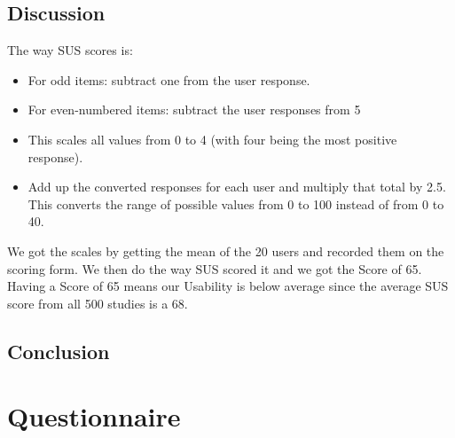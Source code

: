 \documentclass{report}
\begin{document}
\section{Discussion}
The way SUS scores is:
\begin{itemize}
\item For odd items: subtract one from the user response.
\item For even-numbered items: subtract the user responses from 5
\item This scales all values from 0 to 4 (with four being the most positive response).
\item Add up the converted responses for each user and multiply that total by 2.5. This converts the range of possible values from 0 to 100 instead of from 0 to 40.
\end{itemize}
We got the scales by getting the mean of the 20 users and recorded them on the scoring form. We then do the way SUS scored it and we got the Score of 65. Having a Score of 65 means our Usability is below average since the average SUS score from all 500 studies is a 68. 

\section{Conclusion}

\chapter{Questionnaire}
\end{document}
